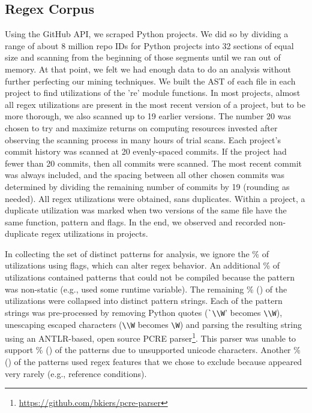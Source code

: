 \subsection{Regex Corpus}
\label{study:corpus}
Using the GitHub API, we scraped  Python projects.  
We did so  by dividing a range of about 8 million repo IDs for Python projects
into 32 sections of equal size and scanning from the beginning of those
segments until we ran out of memory. At that point, we felt we had enough data
to do an analysis without further perfecting our mining techniques. We built
the AST of each file in each project to find utilizations of the 're' module
functions. In most projects, almost all regex utilizations are present in the
most recent version of a project, but to be more thorough, we also scanned up
to 19 earlier versions. The number 20 was chosen to try and maximize returns on
computing resources invested after observing the scanning process in many hours
of trial scans.
Each project's commit history was scanned at 20 evenly-spaced commits.  If the project had fewer than 20 commits, then all commits were scanned.  The most recent commit was always included, and the spacing between all other chosen commits was determined by dividing the remaining number of commits by 19 (rounding as needed).
All regex utilizations were obtained, sans duplicates. Within a project, a duplicate utilization was marked when two versions of the same file have the same function, pattern and flags.  In the end, we observed and recorded  non-duplicate regex utilizations in  projects.

In collecting the set of distinct patterns for analysis,  we ignore the \%  of utilizations using flags, which can alter regex behavior.  An additional \% of utilizations contained patterns that could not be compiled because the pattern was non-static (e.g., used some runtime variable).
The remaining \% () of the utilizations were collapsed into  distinct pattern strings.  Each of the pattern strings was pre-processed by removing Python quotes (\verb!`\\W!' becomes \verb!\\W!), unescaping escaped characters (\verb!\\W! becomes \verb!\W!) and parsing the resulting  string using an ANTLR-based, open source PCRE parser\footnote{\url{https://github.com/bkiers/pcre-parser}}.
This parser was unable to support \% () of the patterns due to unsupported unicode characters.  Another \% () of the patterns used regex features that we  chose to exclude because appeared very rarely (e.g., reference conditions).


